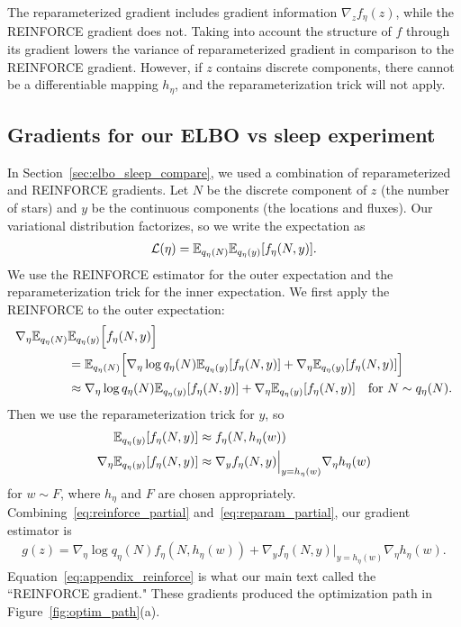 The reparameterized gradient includes gradient information $\nabla_z f_\eta(z)$, while the REINFORCE gradient does not. Taking into account the structure of $f$ through its gradient lowers the variance of reparameterized gradient in comparison to the REINFORCE gradient.
However, if $z$ contains discrete components, there cannot be a differentiable mapping $h_\eta$, and the reparameterization trick will not apply.


\subsection{Gradients for our ELBO vs sleep experiment}
In Section~\ref{sec:elbo_sleep_compare}, we used a combination of reparameterized and REINFORCE gradients.
Let $N$ be the discrete component of $z$ (the number of stars) and $y$ be the continuous components (the locations and fluxes).
Our variational distribution factorizes, so we write the expectation as
\begin{align}
 \mathcal{L}(\eta) = \mathbb{E}_{q_\eta(N)}\mathbb{E}_{q_\eta(y)}[f_\eta(N, y)].
 \label{eq:elbo_factorized}
\end{align}
We use the REINFORCE estimator for the outer expectation and the reparameterization trick for the inner expectation. We first apply the REINFORCE to the outer expectation:
\begin{align}
    \nabla_\eta  \mathbb{E}_{q_\eta(N)}&\mathbb{E}_{q_\eta(y)}\Big[f_\eta(N, y)\Big] \\
    &=  \mathbb{E}_{q_\eta(N)}\Big[ \nabla_\eta \log q_\eta(N) \mathbb{E}_{q_\eta(y)}[f_\eta(N, y)] +
    \nabla_\eta \mathbb{E}_{q_\eta(y)}[f_\eta(N, y)] \Big]\\
    &\approx \nabla_\eta \log q_\eta(N) \mathbb{E}_{q_\eta(y)}[f_\eta(N, y)] +
    \nabla_\eta \mathbb{E}_{q_\eta(y)}[f_\eta(N, y)] \quad \text{for } N \sim q_\eta(N).
    \label{eq:reinforce_partial}
\end{align}
Then we use the reparameterization trick for $y$, so
\begin{align}
    \mathbb{E}_{q_\eta(y)}[f_\eta(N, y)] &\approx f_\eta(N, h_\eta(w))\\
    \nabla_\eta \mathbb{E}_{q_\eta(y)}[f_\eta(N, y)] &\approx  \nabla_y f_\eta(N, y)\Big|_{y = h_\eta(w)}
    \nabla_\eta h_\eta(w)
    \label{eq:reparam_partial}
\end{align}
for $w \sim F$, where $h_\eta$ and $F$ are chosen appropriately. Combining~\eqref{eq:reinforce_partial} and~\eqref{eq:reparam_partial}, our gradient estimator is
\begin{align}
    g(z) = \nabla_\eta \log q_\eta(N)
    f_\eta(N, h_\eta(w)) +
    \nabla_y f_\eta(N, y)\Big|_{y = h_\eta(w)}
    \nabla_\eta h_\eta(w).
    \label{eq:appendix_reinforce}
\end{align}
Equation~\ref{eq:appendix_reinforce} is what our main text called the ``REINFORCE gradient."
These gradients produced the optimization path in Figure~\ref{fig:optim_path}(a).

